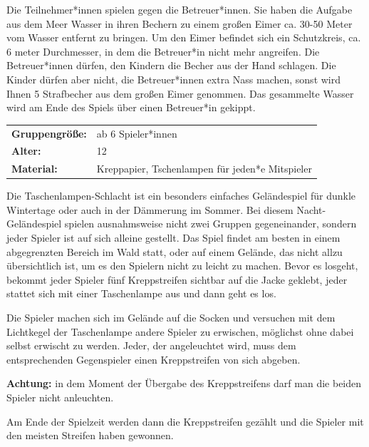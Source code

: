 Die Teilnehmer*innen spielen gegen die Betreuer*innen. Sie haben die Aufgabe aus dem Meer Wasser in ihren Bechern zu einem großen Eimer ca. 30-50 Meter vom Wasser entfernt zu bringen. Um den Eimer befindet sich ein Schutzkreis, ca. 6 meter Durchmesser, in dem die Betreuer*in nicht mehr angreifen. Die Betreuer*innen dürfen, den Kindern die Becher aus der Hand schlagen. Die Kinder dürfen aber nicht, die Betreuer*innen extra Nass machen, sonst wird Ihnen 5 Strafbecher aus dem großen Eimer genommen. Das gesammelte Wasser wird am Ende des Spiels über einen Betreuer*in gekippt. 

\begin{table}[H]
\begin{tabular}{>{\bfseries}lp{8cm}}
   Gruppengröße:   & ab 6 Spieler*innen\\
    Alter: & 12 \\
    Material: & Kreppapier, Tschenlampen für jeden*e Mitspieler  \\ 
\end{tabular}
\end{table} 

Die Taschenlampen-Schlacht ist ein besonders einfaches Geländespiel für dunkle Wintertage oder auch in der 
Dämmerung im Sommer. Bei diesem Nacht-Geländespiel spielen ausnahmsweise nicht zwei Gruppen gegeneinander, sondern jeder Spieler ist auf sich alleine gestellt. Das Spiel findet am besten in einem abgegrenzten Bereich im Wald statt, oder auf einem Gelände, das nicht allzu übersichtlich ist, um es den Spielern nicht zu leicht zu machen. Bevor es losgeht, bekommt jeder Spieler fünf Kreppstreifen sichtbar auf die Jacke geklebt, jeder stattet sich mit einer Taschenlampe aus und dann geht es los.

Die Spieler machen sich im Gelände auf die Socken und versuchen mit dem Lichtkegel der Taschenlampe andere Spieler zu erwischen, möglichst ohne dabei selbst erwischt zu werden. Jeder, der angeleuchtet wird, muss dem entsprechenden Gegenspieler einen Kreppstreifen von sich abgeben.

\textbf{Achtung:} in dem Moment der Übergabe des Kreppstreifens darf man die beiden Spieler nicht anleuchten.

Am Ende der Spielzeit werden dann die Kreppstreifen gezählt und die Spieler mit den meisten Streifen haben gewonnen.

